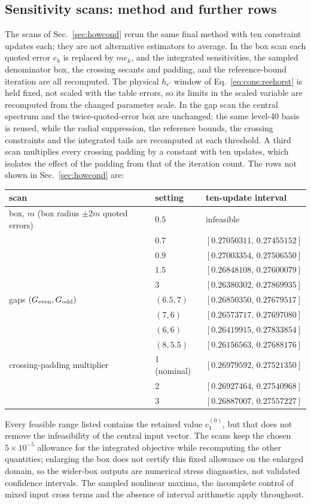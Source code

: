 \documentclass[11pt,a4paper]{article}
\numberwithin{equation}{section}
\newcommand{\sci}[2]{#1\times10^{#2}}
\begin{document}
\subsection{Sensitivity scans: method and further rows}\label{app:cone:sensitivity}
The scans of Sec.~\ref{sec:howcond} rerun the same final method with ten constraint updates each; they are not
alternative estimators to average. In the box scan each quoted error $e_k$ is replaced by $me_k$, and the integrated
sensitivities, the sampled denominator box, the crossing secants and padding, and the reference-bound iteration are all
recomputed. The physical $h_{\epsilon'}$ window of Eq.~\eqref{eq:cone:reehorst} is held fixed, not scaled with the table
errors, so its limits in the scaled variable are recomputed from the changed parameter scale. In the gap scan the
central spectrum and the twice-quoted-error box are unchanged; the same level-40 basis is reused, while the radial
suppression, the reference bounds, the crossing constraints and the integrated tails are recomputed at each threshold.
A third scan multiplies every crossing padding by a constant with ten updates, which isolates the effect of the padding
from that of the iteration count. The rows not shown in Sec.~\ref{sec:howcond} are:
\begin{center}\small
\begin{tabular}{@{}lll@{}}
\toprule
scan & setting & ten-update interval\\
\midrule
box, $m$ (box radius $\pm2m$ quoted errors) & $0.5$ & infeasible\\
 & $0.7$ & $[0.27050311,\,0.27455152]$\\
 & $0.9$ & $[0.27003354,\,0.27506550]$\\
 & $1.5$ & $[0.26848108,\,0.27600079]$\\
 & $3$ & $[0.26380302,\,0.27869935]$\\
\midrule
gaps $(G_{\rm even},G_{\rm odd})$ & $(6.5,7)$ & $[0.26850350,\,0.27679517]$\\
 & $(7,6)$ & $[0.26573717,\,0.27697080]$\\
 & $(6,6)$ & $[0.26419915,\,0.27833854]$\\
 & $(8,5.5)$ & $[0.26156563,\,0.27688176]$\\
\midrule
crossing-padding multiplier & $1$ (nominal) & $[0.26979592,\,0.27521350]$\\
 & $2$ & $[0.26927464,\,0.27540968]$\\
 & $3$ & $[0.26887007,\,0.27557227]$\\
\bottomrule
\end{tabular}
\end{center}
Every feasible range listed contains the retained value $c_1^{(0)}$, but that does not remove the infeasibility of the
central input vector. The scans keep the chosen $\sci{5}{-5}$ allowance for the integrated objective while recomputing
the other quantities; enlarging the box does not certify this fixed allowance on the enlarged domain, so the wider-box
outputs are numerical stress diagnostics, not validated confidence intervals. The sampled nonlinear maxima, the
incomplete control of mixed input cross terms and the absence of interval arithmetic apply throughout.
\end{document}
